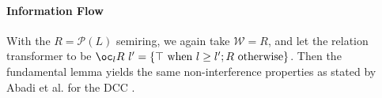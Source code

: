 \vspace{-0.6em}

\paragraph{Information Flow} With the $R = \mathcal{P}(L)$ semiring,
we again take $\mathcal{W} = R$, and let the relation transformer to
be
$\oc_l R~l' = \{\top~\textrm{when }l \geq l'; R~\textrm{otherwise}\}$.
Then the fundamental lemma yields the same non-interference properties
as stated by Abadi et al. for the DCC \cite{abadi99core}.


